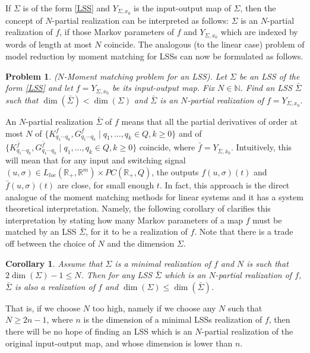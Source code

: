 \documentclass[journal]{IEEEtran}
\newtheorem{Corollary}{Corollary}
\newtheorem{Problem}{Problem}
\begin{document}
If $\Sigma$ is of the form \eqref{LSS} and $Y_{\Sigma,x_0}$ is the input-output map of $\Sigma$, then the concept of $N$-partial realization can be interpreted as follows: $\Sigma$ is an $N$-partial realization of $f$, if those Markov parameters of $f$ and $Y_{\Sigma,x_0}$ which are indexed by words of length at most $N$ coincide. The analogous (to the linear case) problem of model reduction by moment matching for LSSs can now be formulated as follows.

\begin{Problem} \label{prob:momentmatching}
	\emph{($N$-Moment matching problem for an LSS).}
	Let $\Sigma$ be an LSS of the form \eqref{LSS} and let $f=Y_{\Sigma,x_0}$ be its input-output map. Fix $N \in \mathbb{N}$. Find an LSS $\bar{\Sigma}$ such that $\dim (\bar{\Sigma}) < \dim (\Sigma)$ and $\bar{\Sigma}$ is an $N$-partial realization of $f=Y_{\Sigma,x_0}$.
\end{Problem}

An $N$-partial realization $\bar{\Sigma}$ of $f$ means that all the partial derivatives of order at most $N$ of $\{ K^{f}_{q_1\cdots q_k}, G^{f}_{q_1\cdots q_k} \mid q_1,\ldots,q_k \in Q, k \ge 0 \}$ and of $\{ K^{\bar{f}}_{q_1\cdots q_k}, G^{\bar{f}}_{q_1\cdots q_k} \mid q_1,\ldots,q_k \in Q, k \ge 0 \}$ coincide, where $\bar{f}=Y_{\bar{\Sigma},\bar{x}_0}$. Intuitively, this will mean that for any input and switching signal $(u,\sigma) \in L_{loc}(\mathbb{R}_+,\mathbb{R}^m) \times PC(\mathbb{R}_+,Q)$, the outputs $f(u,\sigma)(t)$ and $\bar{f}(u,\sigma)(t)$ are close, for small enough $t$. In fact, this approach is the direct analogue of the moment matching methods for linear systems and it has a system theoretical interpretation. Namely, the following corollary of \cite[Theorem 4]{petreczky} clarifies this interpretation by stating how many Markov parameters of a map $f$ must be matched by an LSS $\bar{\Sigma}$, for it to be a realization of $f$. Note that there is a trade off between the choice of $N$ and the dimension $\Sigma$.

\begin{Corollary} \label{cor:rel_N_n}
	Assume that $\Sigma$ is a minimal realization of $f$ and $N$ is such that $2\dim (\Sigma)-1 \le N$. Then for any LSS $\bar{\Sigma}$ which is an $N$-partial realization of $f$, $\bar{\Sigma}$ is also a realization of $f$ and $\dim (\Sigma) \le \dim (\bar{\Sigma})$.
\end{Corollary}

That is, if we choose $N$ too high, namely if we choose any $N$ such that $N \geq 2n-1$, where $n$ is the dimension of a minimal LSSs realization of $f$, then there will be no hope of finding an LSS which is an $N$-partial realization of the original input-output map, and whose dimension is lower than $n$.
\end{document}
